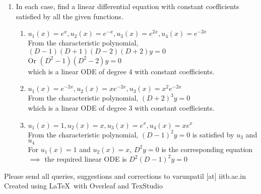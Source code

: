 \documentclass[a4paper]{article}
\begin{document}
\begin{enumerate}
\item In each case, find a linear differential equation with constant coefficients satisfied by all the given functions.
\begin{enumerate}
	\item $u_1(x)=e^x,u_2(x)=e^{-x},u_3(x)=e^{2x},u_4(x)=e^{-2x}$\\
	From the characteristic polynomial, $(D-1)(D+1)(D-2)(D+2)y=0$\\
	Or $(D^2-1)(D^2-2)y=0$\\
	which is a linear ODE of degree 4 with constant coefficients.
	
	\item $u_1(x)=e^{-2x},u_2(x)=xe^{-2x},u_3(x)=x^2e^{-2x}$\\
	From the characteristic polynomial, $(D+2)^3y=0$\\
	which is a linear ODE of degree 3 with constant coefficients.
	
	\item $u_1(x)=1, u_2(x)=x,u_3(x)=e^x,u_4(x)=xe^x$\\
	From the characteristic polynomial, $(D-1)^2y=0$ is satisfied by $u_3$ and $u_4$\\
	For $u_1(x)=1$ and $u_2(x)=x$, $D^2y=0$ is the corresponding equation\\
	$\implies$ the required linear ODE is $D^2(D-1)^2y=0$
	
\end{enumerate}
\end{enumerate}

\begin{center}
Please send all queries, suggestions and corrections to varunpatil [at] iitb.ac.in
\\Created using \LaTeX \ with Overleaf and TexStudio
\end{center}
\end{document}
